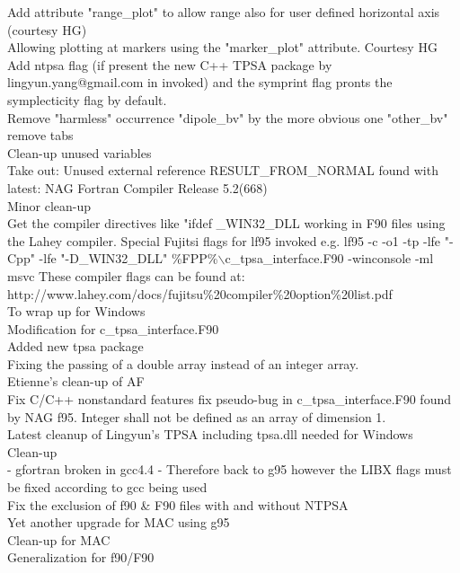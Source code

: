 Add attribute "range\_plot" to allow range also for user defined horizontal axis               (courtesy HG)  \\ 
Allowing plotting at markers using the "marker\_plot" attribute. Courtesy HG  \\ 
Add ntpsa flag (if present the new C++ TPSA package by lingyun.yang@gmail.com in invoked) and the symprint flag pronts the symplecticity flag by default.  \\ 
Remove "harmless" occurrence "dipole\_bv" by the more obvious one "other\_bv"  \\ 
remove tabs  \\ 
Clean-up unused variables  \\ 
Take out:  Unused external reference RESULT\_FROM\_NORMAL found with latest: NAG Fortran Compiler Release 5.2(668)  \\ 
Minor clean-up  \\ 
Get the compiler directives like "ifdef \_WIN32\_DLL working in F90 files using the Lahey compiler. Special Fujitsi flags for lf95 invoked e.g. lf95 -c -o1 -tp -lfe "-Cpp" -lfe "-D\_WIN32\_DLL" \%FPP\%$\backslash$c\_tpsa\_interface.F90 -winconsole -ml msvc  These compiler flags can be found at:  http://www.lahey.com/docs/fujitsu\%20compiler\%20option\%20list.pdf  \\ 
To wrap up for Windows  \\ 
Modification for c\_tpsa\_interface.F90  \\ 
Added new tpsa package  \\ 
Fixing the passing of a double array instead of an integer array.  \\ 
Etienne's clean-up of AF  \\ 
Fix C/C++ nonstandard features fix pseudo-bug in c\_tpsa\_interface.F90 found by NAG f95. Integer shall not be defined as an array of dimension 1.  \\ 
Latest cleanup of Lingyun's TPSA including tpsa.dll needed for Windows  \\ 
Clean-up  \\ 
- gfortran broken in gcc4.4 - Therefore back to g95 however the LIBX flags must be fixed according to gcc being used  \\ 
Fix the exclusion of f90 \& F90 files with and without NTPSA  \\ 
Yet another upgrade for MAC using g95  \\ 
Clean-up for MAC  \\ 
Generalization for f90/F90  \\ 
